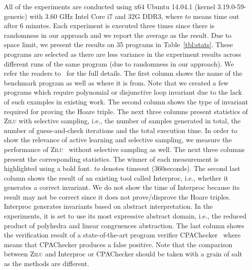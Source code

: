 All of the experiments are conducted using x64 Ubuntu 14.04.1 (kernel 3.19.0-59-generic) with 3.60 GHz Intel Core i7 and 32G DDR3, where $to$ means time out after 6 minutes. Each experiment is executed three times since there is randomness in our approach and we report the average as the result. Due to space limit, we present the results on 35 programs in Table~\ref{tbl:stats}. These programs are selected as there are less variance in the experiment results across different runs of the same program (due to randomness in our approach). We refer the readers to~\cite{zilu:repo} for the full details. The first column shows the name of the benchmark program as well as where it is from. Note that we created a few programs which require polynomial or disjunctive loop invariant due to the lack of such examples in existing work. The second column shows the type of invariant required for proving the Hoare triple. The next three columns present statistics of \textsc{Zilu} with selective sampling, i.e., the number of samples generated in total, the number of guess-and-check iterations and the total execution time. In order to show the relevance of active learning and selective sampling, we measure the performance of \textsc{Zilu}~\cite{zilu:repo} without selective sampling as well. The next three columns present the corresponding statistics. The winner of each measurement is highlighted using a bold font. {\em to} denotes timeout (360seconds).
The second last column shows the result of an existing tool called Interproc, i.e., whether it generates a correct invariant. We do not show the time of Interproc because its result may not be correct since it does not prove/disprove the Hoare triples. Interproc generates invariants based on abstract interpretation. In the experiments, it is set to use its most expressive abstract domain, i.e., the reduced product of polyhedra and linear congruences abstraction.
The last column shows the verification result of a state-of-the-art
program verifier CPAChecker~\cite{DBLP:conf/cav/BeyerK11} where  means that CPAChecker produces a false positive. %
 Note that the comparison between \textsc{Zilu} and Interproc or CPAChecker should be taken with a grain of salt as the methods are different.

